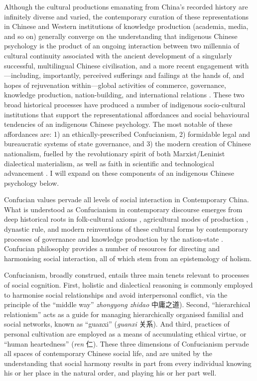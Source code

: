 \begin{CJK}{UTF8}{gbsn}
Although the cultural productions emanating from China's recorded history are infinitely diverse and varied, the contemporary curation of these representations in Chinese and Western institutions of knowledge production (academia, media, and so on) generally converge on the understanding that indigenous Chinese psychology is the product of an ongoing interaction between two millennia of cultural continuity associated with the ancient development of a singularly successful, multilingual Chinese civilisation, and a more recent engagement with---including, importantly, perceived sufferings and failings at the hands of, and hopes of rejuvenation within---global activities of commerce, governance, knowledge production, nation-building, and international relations \citep{Liu2009}.  These two broad historical processes have produced a number of indigenous socio-cultural institutions that support the representational affordances and social behavioural tendencies of an indigenous Chinese psychology.  The most notable of these affordances are: 1) an ethically-prescribed Confucianism, 2) formidable legal and bureaucratic systems of state governance, and 3) the modern creation of Chinese nationalism, fuelled by the revolutionary spirit of both Marxist/Leninist dialectical materialism, as well as faith in scientific and technological advancement \citep{Barme2009}.  I will expand on these components of an indigenous Chinese psychology below.

Confucian values pervade all levels of social interaction in Contemporary China. What is understood as Confucianism in contemporary discourse emerges from deep historical roots in folk-cultural axioms \citep{Wang2009}, agricultural modes of production \citep{Talhelm2014,Fei1992}, dynastic rule, and modern reinventions of these cultural forms by contemporary processes of governance and knowledge production by the nation-state \citep{Hwang1999,Liu2014}.  Confucian philosophy provides a number of resources for directing and harmonising social interaction, all of which stem from an epistemology of holism.

Confucianism, broadly construed, entails three main tenets relevant to processes of social cognition.  First, holistic and dialectical reasoning is commonly employed to harmonise social relationships and avoid interpersonal conflict, via the principle of the  ``middle way'' \textit{zhongyong zhidao} 中庸之道).  Second, ``hierarchical relationism'' acts as a guide for managing hierarchically organised familial and social networks, known as ``guanxi'' (\textit{guanxi} 关系). And third, practices of personal cultivation are employed as a means of accumulating ethical virtue, or ``human heartedness'' (\textit{ren} 仁).  These three dimensions of Confucianism pervade all spaces of contemporary Chinese social life, and are united by the understanding that social harmony results in part from every individual knowing his or her place in the natural order, and playing his or her part well.


\end{CJK}
